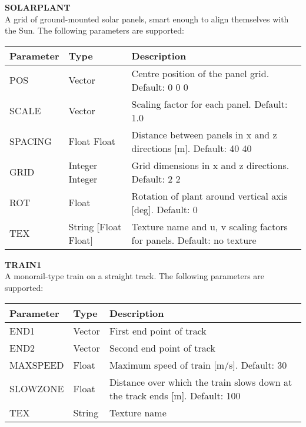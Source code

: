\documentclass[Orbiter Developer Manual.tex]{subfiles}
\begin{document}
\noindent
\textbf{SOLARPLANT}\\
A grid of ground-mounted solar panels, smart enough to align themselves with the Sun. The following parameters are supported:

	\begin{longtable}{ |p{}|p{}|p{}| }
	\hline\rule{0pt}{2ex}
	\textbf{Parameter} & \textbf{Type} & \textbf{Description}\\
	\hline\rule{0pt}{2ex}
	POS & Vector & Centre position of the panel grid. Default: 0 0 0\\
	\hline\rule{0pt}{2ex}
	SCALE & Vector & Scaling factor for each panel. Default: 1.0\\
	\hline\rule{0pt}{2ex}
	SPACING & Float Float & Distance between panels in x and z directions [m]. Default: 40 40\\
	\hline\rule{0pt}{2ex}
	GRID & Integer Integer & Grid dimensions in x and z directions. Default: 2 2\\
	\hline\rule{0pt}{2ex}
	ROT & Float & Rotation of plant around vertical axis [deg]. Default: 0\\
	\hline\rule{0pt}{2ex}
	TEX & String [Float Float] & Texture name and u, v scaling factors for panels. Default: no texture\\
	\hline
	\end{longtable}

\noindent
\textbf{TRAIN1}\\
A monorail-type train on a straight track. The following parameters are supported:

	\begin{longtable}{ |p{}|p{}|p{}| }
	\hline\rule{0pt}{2ex}
	\textbf{Parameter} & \textbf{Type} & \textbf{Description}\\
	\hline\rule{0pt}{2ex}
	END1 & Vector & First end point of track\\
	\hline\rule{0pt}{2ex}
	END2 & Vector & Second end point of track\\
	\hline\rule{0pt}{2ex}
	MAXSPEED & Float & Maximum speed of train [m/s]. Default: 30\\
	\hline\rule{0pt}{2ex}
	SLOWZONE & Float & Distance over which the train slows down at the track ends [m]. Default: 100\\
	\hline\rule{0pt}{2ex}
	TEX & String & Texture name\\
	\hline
	\end{longtable}
\end{document}
